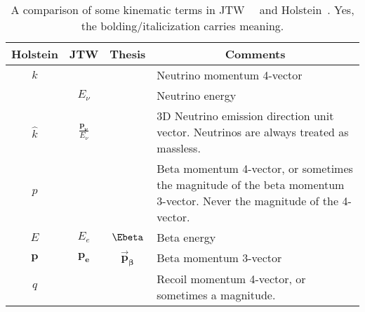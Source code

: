 %
%
%
\renewcommand{\arraystretch}{1.6}
\begin{table}[h!!!!t]
	\begin{center}
	\begin{tabular}{ | c | c | c | p{3.35in} | }
		\multicolumn{1}{c}{Holstein} 				& \multicolumn{1}{c}{JTW} 								& \multicolumn{1}{c}{Thesis} 	& \multicolumn{1}{c}{Comments}
		\\  \hline
		$k$											& 														& 								& Neutrino momentum 4-vector%
		\\  \hline
		$ $											& $E_\nu$												& 								& Neutrino energy
		\\  \hline
		$\hat{k}$ 									& $\displaystyle \frac{\mathbf{p_{\bm{\nu}}}}{E_\nu} $	&  %
																																			& 3D Neutrino emission direction unit vector.  Neutrinos are always treated as massless.
		\\  \hline
		$p$											& 														& 								& Beta momentum 4-vector, or sometimes the magnitude of the beta momentum 3-vector.  Never the magnitude of the 4-vector.
		\\  \hline
		$E$											& $E_e$													& $\Ebeta$						& Beta energy
		\\  \hline
		$ \mathbf{p} $								& $\mathbf{p_e}$										& $\bm{\vec{p}_\beta}$			& Beta momentum 3-vector
		\\  \hline
		$q$											&  														&								& Recoil momentum 4-vector, or sometimes a magnitude.
		\\  \hline
	\end{tabular}
	\end{center}
	\caption[Kinematic Terms Guide]{A comparison of some kinematic terms in JTW~\cite{jtw}~\cite{jtw_coulomb} and Holstein~\cite{holstein}.  Yes, the bolding/italicization carries meaning.  }
	\label{table:compare_notation_kinematic}
\end{table}
\renewcommand{\arraystretch}{1}
%
%